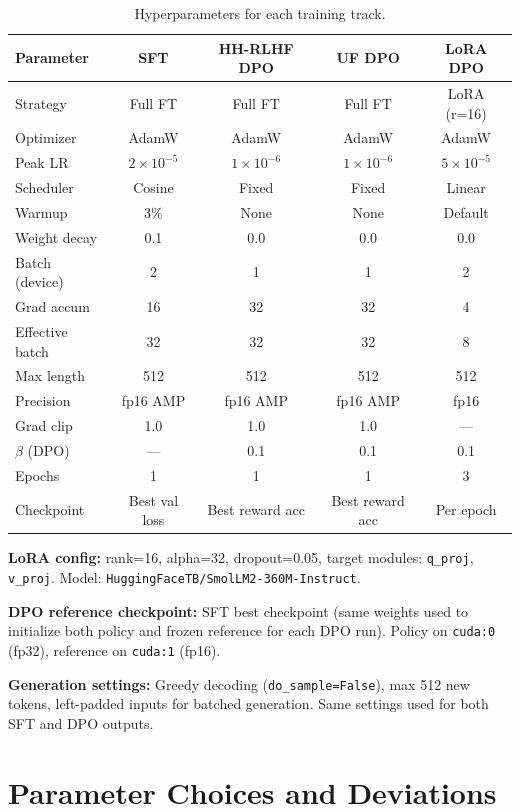 \documentclass[11pt,a4paper]{article}
\begin{document}
\begin{table}[H]
\centering
\caption{Hyperparameters for each training track.}
\small
\begin{tabular}{lcccc}
\toprule
\textbf{Parameter} & \textbf{SFT} & \textbf{HH-RLHF DPO} & \textbf{UF DPO} & \textbf{LoRA DPO} \\
\midrule
Strategy & Full FT & Full FT & Full FT & LoRA (r=16) \\
Optimizer & AdamW & AdamW & AdamW & AdamW \\
Peak LR & $2 \times 10^{-5}$ & $1 \times 10^{-6}$ & $1 \times 10^{-6}$ & $5 \times 10^{-5}$ \\
Scheduler & Cosine & Fixed & Fixed & Linear \\
Warmup & 3\% & None & None & Default \\
Weight decay & 0.1 & 0.0 & 0.0 & 0.0 \\
Batch (device) & 2 & 1 & 1 & 2 \\
Grad accum & 16 & 32 & 32 & 4 \\
Effective batch & 32 & 32 & 32 & 8 \\
Max length & 512 & 512 & 512 & 512 \\
Precision & fp16 AMP & fp16 AMP & fp16 AMP & fp16 \\
Grad clip & 1.0 & 1.0 & 1.0 & --- \\
$\beta$ (DPO) & --- & 0.1 & 0.1 & 0.1 \\
Epochs & 1 & 1 & 1 & 3 \\
Checkpoint & Best val loss & Best reward acc & Best reward acc & Per epoch \\
\bottomrule
\end{tabular}
\end{table}

\textbf{LoRA config:} rank=16, alpha=32, dropout=0.05, target modules: \texttt{q\_proj}, \texttt{v\_proj}. Model: \texttt{HuggingFaceTB/SmolLM2-360M-Instruct}.

\textbf{DPO reference checkpoint:} SFT best checkpoint (same weights used to initialize both policy and frozen reference for each DPO run). Policy on \texttt{cuda:0} (fp32), reference on \texttt{cuda:1} (fp16).

\textbf{Generation settings:} Greedy decoding (\texttt{do\_sample=False}), max 512 new tokens, left-padded inputs for batched generation. Same settings used for both SFT and DPO outputs.

\section{Parameter Choices and Deviations}
\label{sec:deviations}
\end{document}
